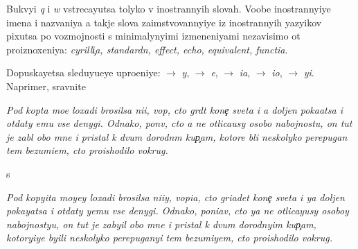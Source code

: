 \documentclass[10pt]{article}
\begin{document}
Bukvyi \textit{q} i \textit{w} vstrecayutsa tolyko v inostrannyih slovah.
Voob{\x}e inostrannyiye imena i nazvaniya a takje slova zaimstvovannyiye iz
inostrannyih yazyikov pixutsa po vozmojnosti s minimalynyimi izmeneniyami
nezavisimo ot pro\-iz\-no\-xe\-ni\-ya:
\textit{cyrilli{\c}a, standardn{\yi}{\y}, effect, echo, equivalent, functi{\y}a}.

Dopuskayetsa sleduyu{\x}eye upro{\x}eniye:
    \textit{{\y}}  $\rightarrow$ \textit{y},
    \textit{{\e}}  $\rightarrow$ \textit{e},
    \textit{{\ia}} $\rightarrow$ \textit{ia},
    \textit{{\io}} $\rightarrow$ \textit{io},
    \textit{{\yi}} $\rightarrow$ \textit{yi}.
Naprimer, sravnite

\noindent\textit{Pod kop{\yi}ta mo{\y}e{\y} loxadi brosilsa ni{\x}i{\y}, vop{\ia}, cto gr{\ia}d{\e}t kone{\c} sveta i {\y}a doljen poka{\y}atsa i otdaty {\y}emu vse denygi. Odnako, pon{\ia}v, cto {\y}a ne otlica{\y}usy osobo{\y} nabojnost{\y}u, on tut je zab{\yi}l obo mne i pristal k dvum dorodn{\yi}m kup{\c}am, kotor{\yi}{\y}e b{\yi}li neskolyko perepugan{\yi} tem bezumi{\y}em, cto proishodilo vokrug.}

\noindent s

\noindent\textit{Pod kopyita moyey loxadi brosilsa ni{\x}iy, vopia, cto griadet kone{\c} sveta i ya doljen pokayatsa i otdaty yemu vse denygi. Odnako, poniav, cto ya ne otlicayusy osoboy nabojnostyu, on tut je zabyil obo mne i pristal k dvum dorodnyim kup{\c}am, kotoryiye byili neskolyko perepuganyi tem bezumiyem, cto proishodilo vokrug.}


\end{document}
